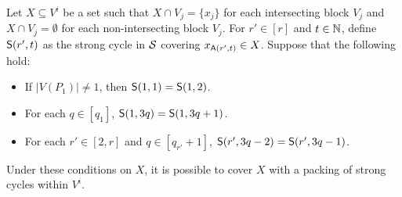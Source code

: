 \begin{lemma} \label{lemma:2mod3:ultimate}
  Let $X \subseteq V^i$ be a set such that $X \cap V_j = \{ x_j \}$ for each intersecting block $V_j$ and $X \cap V_j = \emptyset$ for each non-intersecting block $V_j$.
  For $r' \in [r]$ and $t \in \mathbb N$,
  define $\mathsf{S}(r', t)$ as the strong cycle in $\mathcal S$ covering $x_{\mathsf{A}(r', t)} \in X$.
  Suppose that the following hold:
  \begin{itemize}
    \item If  $|V(P_1)| \ne 1$, then $\mathsf{S}(1, 1) = \mathsf{S}(1, 2)$.
    \item For each $q \in [q_1]$, $\mathsf{S}(1, 3q) = \mathsf{S}(1, 3q + 1)$.
    \item For each $r' \in [2, r]$ and $q \in [q_{r'} + 1]$, $\mathsf{S}(r', 3q - 2) = \mathsf{S}(r', 3q - 1)$.
  \end{itemize}
  Under these conditions on $X$, it is possible to cover $X$ with a packing of strong cycles within $V^i$.
\end{lemma}
